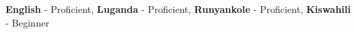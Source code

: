 \documentclass[9pt]{developercv} %
\begin{document}
    \hspace{5mm} \textbf{English} - Proficient, \textbf{Luganda} - Proficient, \textbf{Runyankole} - Proficient, \textbf{Kiswahili} - Beginner


    

\end{document}
